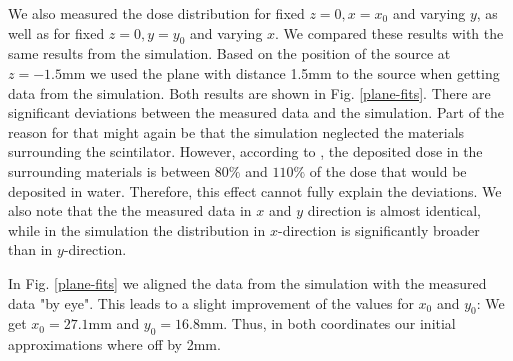\documentclass[a4paper,parskip]{scrartcl}
\begin{document}
We also measured the dose distribution for fixed $z=0, x=x_0$ and varying $y$, as well as for fixed $z=0, y=y_0$ and varying $x$. We compared these results with the same results from the simulation. Based on the position of the source at $z=-1.5 \mathrm{mm}$ we used the plane with distance 1.5mm to the source when getting data from the simulation.  Both results are shown in Fig. \ref{plane-fits}. There are significant deviations between the measured data and the simulation. Part of the reason for that might again be that the simulation neglected the materials surrounding the scintilator. However, according to \cite{Ref:2}, the deposited dose in the surrounding materials is between 80$\%$ and $110\%$ of the dose that would be deposited in water. Therefore, this effect cannot fully explain the deviations. We also note that the the measured data in $x$ and $y$ direction is almost identical, while in the simulation the distribution in $x$-direction is significantly broader than in $y$-direction.

In Fig. \ref{plane-fits} we aligned the data from the simulation with the measured data "by eye". This leads to a slight improvement of the values for $x_0$ and $y_0$: We get $x_0=27.1 \mathrm{mm}$ and $y_0 = 16.8 \mathrm{mm}$. Thus, in both coordinates our initial approximations where off by 2mm.
\end{document}
